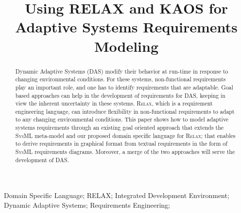 \documentclass[10pt, conference, compsocconf]{IEEEtran}
\def\myrelax{\textsc{Relax}}                  %
\def\sysml{\textsc{SysML}}
\begin{document}
%
\title{Using RELAX and KAOS for Adaptive Systems Requirements Modeling}



\author{
\and
{}
}


\maketitle

\begin{abstract}
Dynamic Adaptive Systems (DAS) modify their behavior at run-time in response to 
changing environmental conditions. For these systems, non-functional requirements play an 
important role, and one has to identify requirements that are adaptable.  Goal based approaches can help in the development of requirements for DAS, keeping in view the inherent uncertainty in these systems. \myrelax{}, which is a requirement engineering language, can introduce flexibility in 
non-functional requirements to adapt to any changing environmental conditions. 
This paper shows how to model adaptive systems requirements through an existing goal 
oriented approach that extends the \sysml{} meta-model and our proposed domain 
specific language for \myrelax{}; that enables to derive requirements in graphical 
format from textual requirements in the form of \sysml{} requirements diagrams. 
Moreover, a merge of the two approaches will serve the development of DAS.
\end{abstract}

\begin{IEEEkeywords}
Domain Specific Language; RELAX; Integrated Development Environment; Dynamic Adaptive Systems; Requirements Engineering;

\end{IEEEkeywords}
\end{document}
